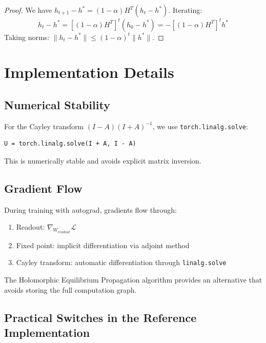 \documentclass[11pt,a4paper]{article}
\newcommand{\LL}{\mathcal{L}}
\begin{document}
\begin{proof}
We have $h_{t+1} - h^* = (1-\alpha)H^T(h_t - h^*)$. Iterating:
\begin{equation}
h_t - h^* = [(1-\alpha)H^T]^t (h_0 - h^*) = -[(1-\alpha)H^T]^t h^*
\end{equation}
Taking norms: $\|h_t - h^*\| \leq (1-\alpha)^t \|h^*\|$.
\end{proof}

\section{Implementation Details}
\label{app:implementation}

\subsection{Numerical Stability}

For the Cayley transform $(I-A)(I+A)^{-1}$, we use \texttt{torch.linalg.solve}:
\begin{verbatim}
U = torch.linalg.solve(I + A, I - A)
\end{verbatim}
This is numerically stable and avoids explicit matrix inversion.

\subsection{Gradient Flow}

During training with autograd, gradients flow through:
\begin{enumerate}
    \item Readout: $\nabla_{W_{readout}}\LL$
    \item Fixed point: implicit differentiation via adjoint method
    \item Cayley transform: automatic differentiation through \texttt{linalg.solve}
\end{enumerate}

The Holomorphic Equilibrium Propagation algorithm provides an alternative that avoids storing the full computation graph.

\subsection{Practical Switches in the Reference Implementation}
\label{app:impl_switches}
\end{document}
